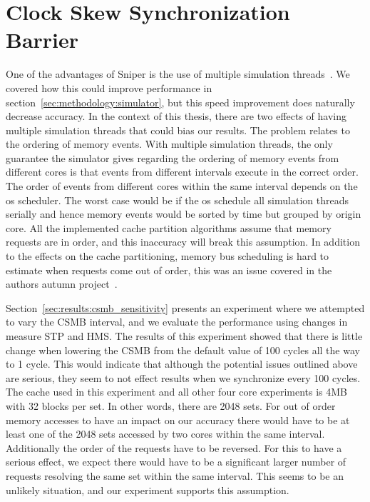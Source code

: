 \section{Clock Skew Synchronization Barrier}

One of the advantages of Sniper is the use of multiple simulation threads~\cite{Carlson2011a}.
We covered how this could improve performance in section~\ref{sec:methodology:simulator}, but this speed improvement does naturally decrease accuracy.
In the context of this thesis, there are two effects of having multiple
simulation threads that could bias our results.
The problem relates to the ordering of memory events.
With multiple simulation threads, the only guarantee the simulator gives regarding the ordering of memory events from different cores is that events from different intervals execute in the correct order.
The order of events from different cores within the same interval depends on the os scheduler.
The worst case would be if the os schedule all simulation threads serially and hence memory events would be sorted by time but grouped by origin core.
All the implemented cache partition algorithms assume that memory requests are in order, and this inaccuracy will break this assumption.
In addition to the effects on the cache partitioning, memory bus scheduling is hard to estimate when requests come out of order, this was an issue covered in the authors autumn project~\cite{Olsen2014}.

Section~\ref{sec:results:csmb_sensitivity} presents an experiment where we attempted to vary the CSMB interval, and we evaluate the performance using changes in measure STP and HMS.
The results of this experiment showed that there is little change when lowering the CSMB from the default value of 100 cycles all the way to 1 cycle.
This would indicate that although the potential issues outlined above are serious, they seem to not effect results when we synchronize every 100 cycles.
The cache used in this experiment and all other four core experiments is 4MB with 32 blocks per set.
In other words, there are 2048 sets.
For out of order memory accesses to have an impact on our accuracy there would have to be at least one of the 2048 sets accessed by two cores within the same interval.
Additionally the order of the requests have to be reversed.
For this to have a serious effect, we expect there would have to be a significant larger number of requests resolving the same set within the same interval.
This seems to be an unlikely situation, and our experiment supports this assumption.

